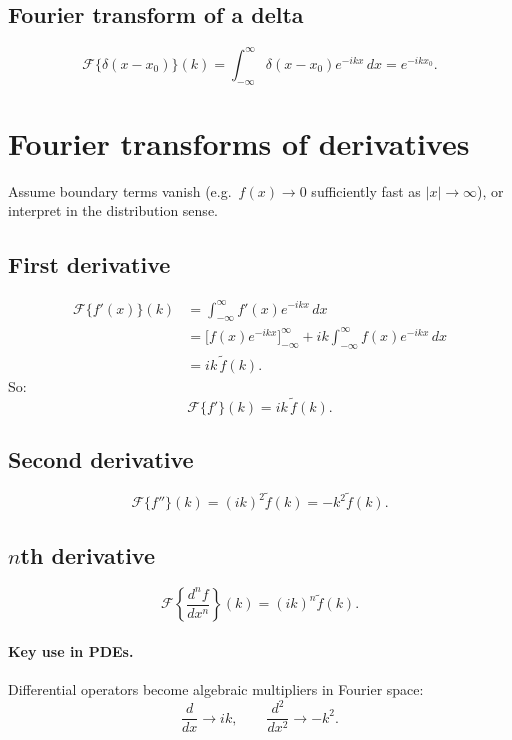 \subsection{Fourier transform of a delta}
\begin{equation}
\mathcal{F}\{\delta(x-x_0)\}(k)
= \int_{-\infty}^{\infty}\delta(x-x_0)e^{-ikx}\,dx
= e^{-ikx_0}.
\end{equation}


\section{Fourier transforms of derivatives}

Assume boundary terms vanish (e.g.\ $f(x)\to 0$ sufficiently fast as $|x|\to\infty$),
or interpret in the distribution sense.

\subsection{First derivative}
\begin{align}
\mathcal{F}\{f'(x)\}(k)
&= \int_{-\infty}^{\infty} f'(x)e^{-ikx}\,dx\\
&= \Big[f(x)e^{-ikx}\Big]_{-\infty}^{\infty}
+ik\int_{-\infty}^{\infty}f(x)e^{-ikx}\,dx\\
&= ik\,\tilde f(k).
\end{align}
So:
\begin{equation}
\boxed{\mathcal{F}\{f'\}(k)=ik\,\tilde f(k)}.
\end{equation}

\subsection{Second derivative}
\begin{equation}
\mathcal{F}\{f''\}(k)=(ik)^2\tilde f(k)=-k^2\tilde f(k).
\end{equation}

\subsection{$n$th derivative}
\begin{equation}
\boxed{\mathcal{F}\left\{\frac{d^n f}{dx^n}\right\}(k)=(ik)^n\tilde f(k)}.
\end{equation}

\paragraph{Key use in PDEs.}
Differential operators become algebraic multipliers in Fourier space:
\[
\frac{d}{dx}\to ik,\qquad \frac{d^2}{dx^2}\to -k^2.
\]

